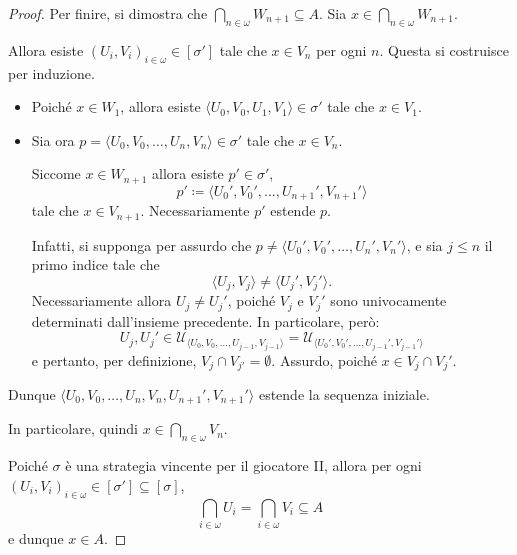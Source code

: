 \documentclass[titlepage]{article}
\newcommand{\1}{\mathds{1}}
\theoremstyle{definition}%
\theoremstyle{plain}
\theoremstyle{remark}
\begin{document}
\begin{proof}
Per finire, si dimostra che \(\bigcap_{n \in \omega} W_{n+1} \subseteq A\). Sia \(x \in \bigcap_{n \in \omega} W_{n+1}\).

Allora esiste \((U_{i}, V_{i})_{i \in \omega} \in [\sigma']\) tale che \(x \in V_{n}\) per ogni \(n\). Questa si costruisce per induzione.
\begin{itemize}
\item Poiché \(x \in W_{1}\), allora esiste \(\langle U_{0},V_{0},U_{1},V_{1}\rangle \in \sigma'\) tale che \(x \in V_{1}\).
\item Sia ora \(p=\langle U_{0},V_{0},\dots,U_{n}, V_{n}\rangle \in\sigma'\) tale che \(x \in V_{n}\).

Siccome \(x \in W_{n+1}\) allora esiste \(p' \in\sigma'\),
\begin{equation*}
  p'\coloneqq \langle U_{0}',V_{0}',\dots,U_{n+1}',V_{n+1}'\rangle
\end{equation*}
tale che \(x \in V_{n+1}\). Necessariamente \(p'\) estende \(p\).

Infatti, si supponga per assurdo che \(p \neq \langle U_{0}',V_{0}',\dots,U_{n}',V_{n}'\rangle\), e sia \(j\le n\) il primo indice tale che
\begin{equation*}
  \langle U_{j}, V_{j}\rangle \neq \langle U_{j}', V_{j}'\rangle.
\end{equation*}
Necessariamente allora \(U_{j}\neq U_{j}'\), poiché \(V_{j}\) e \(V_{j}'\) sono univocamente determinati dall'insieme precedente. In particolare, però:
\begin{equation*}
  U_{j}, U_{j}' \in \mathcal{U}_{\langle U_{0},V_{0},\dots,U_{j-1},V_{j-1}\rangle} = \mathcal{U}_{\langle U_{0}',V_{0}',\dots,U_{j-1}',V_{j-1}'\rangle}
\end{equation*}
e pertanto, per definizione, \(V_{j}\cap V_{j'} = \emptyset\). Assurdo, poiché \(x \in V_{j}\cap V_{j}'\).
\end{itemize}

Dunque \(\langle U_{0},V_{0},\dots,U_{n}, V_{n}, U_{n+1}', V_{n+1}'\rangle\) estende la sequenza iniziale.

In particolare, quindi \(x \in \bigcap_{n \in \omega} V_{n}\).

Poiché \(\sigma\) è una strategia vincente per il giocatore II, allora per ogni \((U_{i}, V_{i})_{i \in \omega} \in [\sigma'] \subseteq [\sigma]\),
\begin{equation*}
\bigcap_{i \in \omega} U_{i} = \bigcap_{i \in \omega} V_{i}\subseteq A
\end{equation*}
e dunque \(x \in A\).
\end{proof}
\end{document}
